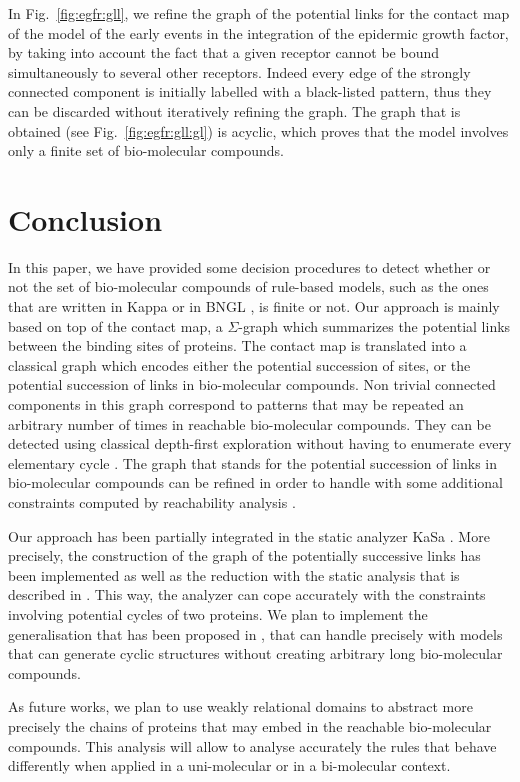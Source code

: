 \documentclass{entcs}
\begin{document}
\begin{exmp}
In Fig.~\ref{fig:egfr:gll}, we refine the graph of the potential links for the contact map of the model of the early events in the integration of the epidermic growth factor, by taking into account the fact that a given receptor cannot be bound simultaneously to several other receptors.
Indeed every edge of the strongly connected component is initially labelled with a black-listed pattern, thus they can be discarded without iteratively refining the graph. The graph that is obtained (see Fig.~\ref{fig:egfr:gll:gl}) is acyclic, which proves that the model involves only a finite set of bio-molecular compounds.
\end{exmp}


\label{sec:refinement}
\section{Conclusion}

In this paper, we have provided some decision procedures
to detect whether or not the set of bio-molecular compounds of rule-based models, such as the ones that are written in Kappa \cite{DBLP:journals/tcs/DanosL04} or in BNGL \cite{BNGL}, is finite or not.
Our approach is mainly based on top of the contact map, a $\Sigma$-graph which summarizes
the potential links between the binding sites of proteins. The contact map is translated into a classical graph which encodes either the potential succession of sites, or the potential succession of links in bio-molecular compounds.
Non trivial connected components in this graph correspond to  patterns that may be repeated an arbitrary number of times in reachable bio-molecular compounds. They can be detected using classical depth-first exploration without having to enumerate every elementary cycle \cite{tarjan}.
The graph that stands for the potential succession of links in bio-molecular compounds can be refined in order to handle with some additional constraints  computed by reachability analysis \cite{DanosEtAl-VMCAI08,SASB2016,KaSa}.

Our approach has been partially integrated in the static analyzer KaSa \cite{KaSa}. More precisely, the construction of the graph of the potentially
successive links has been implemented as well as the reduction with the static analysis that is described in \cite{SASB2016}. This way, the analyzer can cope accurately with the constraints involving potential cycles of two proteins.  We plan to implement the generalisation that has been proposed in \cite{afp}, that can handle precisely with models that can generate cyclic structures without creating arbitrary long bio-molecular compounds.

As future works, we plan to use weakly relational domains \cite{DBLP:conf/sas/Mine02} to abstract more precisely the chains of proteins that may embed in the reachable bio-molecular compounds. This analysis will allow to analyse accurately the rules that behave differently when applied in a uni-molecular or in a bi-molecular context.



\end{document}
